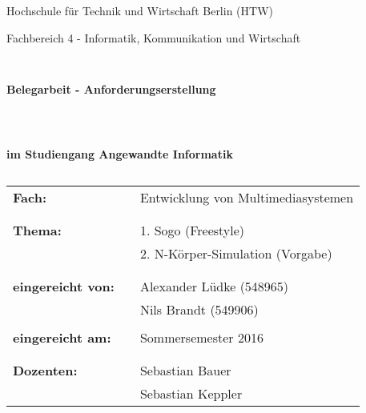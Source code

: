 \documentclass[a4paper]{scrartcl}
\begin{document}
\thispagestyle{empty}

%
%

\thispagestyle{empty}
\begin{center}
\Large{Hochschule für Technik und Wirtschaft Berlin (HTW)}\\
\end{center}
 
 
\begin{center}
\Large{Fachbereich 4 - Informatik, Kommunikation und Wirtschaft}
\end{center}
\begin{verbatim}


\end{verbatim}
\begin{center}
\textbf{\LARGE{Belegarbeit - Anforderungserstellung}}
\end{center}
\begin{verbatim}
 
 
\end{verbatim}
\begin{center}
\textbf{im Studiengang Angewandte Informatik}
\end{center}
\begin{verbatim}
\end{verbatim}
 
\begin{flushleft}
\begin{tabular}{lll}
\textbf{Fach:} & & Entwicklung von Multimediasystemen\\
& & \\
& & \\
\textbf{Thema:} & & 1. Sogo (Freestyle)\\
& & 2. N-Körper-Simulation (Vorgabe)\\
& & \\
& & \\
\textbf{eingereicht von:} & & Alexander Lüdke (548965)\\
& & Nils Brandt (549906)\\
& & \\
\textbf{eingereicht am:} & & Sommersemester 2016 \\
& & \\
& & \\
\textbf{Dozenten:} & & Sebastian Bauer\\
& & Sebastian Keppler \\
\end{tabular}
\end{flushleft}
\end{document}
